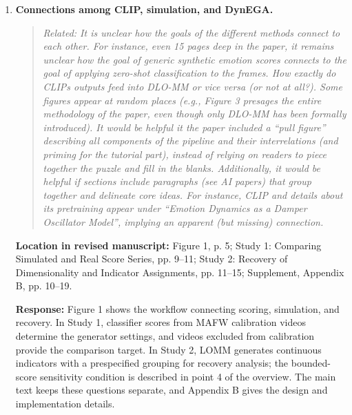 \documentclass[11pt]{article}
\newenvironment{reviewquote}{\begin{quote}\small\itshape}{\end{quote}}
\newcommand{\point}[1]{\textbf{#1.}}
\newcommand{\location}[1]{\textbf{Location in revised manuscript:} #1\par}
\newcommand{\response}{\textbf{Response:} }
\begin{document}
\begin{enumerate}
  \item \point{Connections among CLIP, simulation, and DynEGA}
  \begin{reviewquote}
  Related: It is unclear how the goals of the different methods connect to each other. For instance, even 15 pages deep in the paper, it remains unclear how the goal of generic synthetic emotion scores connects to the goal of applying zero-shot classification to the frames. How exactly do CLIPs outputs feed into DLO-MM or vice versa (or not at all?). Some figures appear at random places (e.g., Figure 3 presages the entire methodology of the paper, even though only DLO-MM has been formally introduced). It would be helpful it the paper included a ``pull figure'' describing all components of the pipeline and their interrelations (and priming for the tutorial part), instead of relying on readers to piece together the puzzle and fill in the blanks. Additionally, it would be helpful if sections include paragraphs (see AI papers) that group together and delineate core ideas. For instance, CLIP and details about its pretraining appear under ``Emotion Dynamics as a Damper Oscillator Model'', implying an apparent (but missing) connection.
  \end{reviewquote}
  \location{Figure 1, p. 5; Study 1: Comparing Simulated and Real Score Series, pp. 9--11; Study 2: Recovery of Dimensionality and Indicator Assignments, pp. 11--15; Supplement, Appendix B, pp. 10--19.}
  \response Figure 1 shows the workflow connecting scoring, simulation, and recovery. In Study 1, classifier scores from MAFW calibration videos determine the generator settings, and videos excluded from calibration provide the comparison target. In Study 2, LOMM generates continuous indicators with a prespecified grouping for recovery analysis; the bounded-score sensitivity condition is described in point 4 of the overview. The main text keeps these questions separate, and Appendix B gives the design and implementation details.


\end{enumerate}
\end{document}
